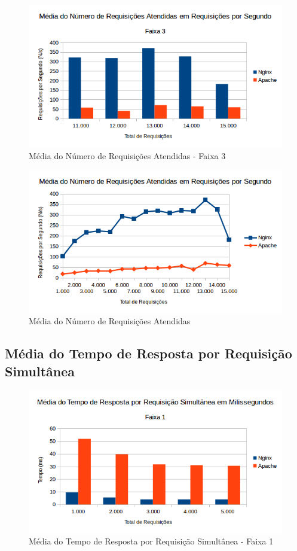 \begin{figure}[H]
	\centering
	\includegraphics[width=1\linewidth]{graficos/grafico4-f3} 
	\caption{Média do Número de Requisições Atendidas - Faixa 3}
	\label{fig:grafico4-f3}
\end{figure}

\begin{figure}[H]
	\centering
	\includegraphics[width=1\linewidth]{graficos/grafico4} 
	\caption{Média do Número de Requisições Atendidas}
	\label{fig:grafico4}
\end{figure}


\subsection{Média do Tempo de Resposta por Requisição Simultânea}
\begin{figure}[H]
	\centering
	\includegraphics[width=1\linewidth]{graficos/grafico5-f1} 
	\caption{Média do Tempo de Resposta por Requisição Simultânea - Faixa 1}
	\label{fig:grafico5-f1}
\end{figure}

